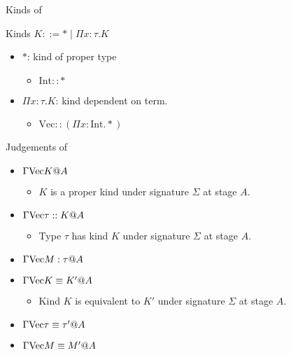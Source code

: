 \documentclass[dvipdfmx,aspectratio=169, 20pt]{beamer}
\begin{document}
\begin{frame}[fragile]{Kinds of \LMD}
    \begin{block}{Kinds}
        \( K ::= * \mid \Pi x:\tau.K \)
    \end{block}
    \begin{itemize}
        \item \( * \): kind of proper type
            \begin{itemize}
                \item \( \text{Int} :: * \)
            \end{itemize}
        \item \( \Pi x:\tau.K \): kind dependent on term.
            \begin{itemize}
                \item \( \text{Vec} :: (\Pi x:\text{Int}.*) \)
            \end{itemize}
    \end{itemize}
    \note{
    }
\end{frame}

\begin{frame}[fragile]{Judgements of \LMD}
    \begin{itemize}
        \item \( \Gamma \text{Vec} K @ A \)
            \begin{itemize}
                \item \( K \) is a proper kind under signature \( \Sigma \) at stage \( A \).
            \end{itemize}
        \item \( \Gamma \text{Vec} \tau :: K @ A \)
            \begin{itemize}
                \item Type \( \tau \) has kind \( K \) under signature \( \Sigma \) at stage \( A \).
            \end{itemize}
        \item \( \Gamma \text{Vec} M : \tau @ A \)
        \item \( \Gamma \text{Vec} K \equiv K' @ A \)
            \begin{itemize}
                \item Kind \( K \) is equivalent to \( K' \) under signature \( \Sigma \) at stage \( A \).
            \end{itemize}
        \item \( \Gamma \text{Vec} \tau \equiv \tau' @ A \)
        \item \( \Gamma \text{Vec} M \equiv M' @ A \)
    \end{itemize}
    \note{
    }
\end{frame}
\end{document}
